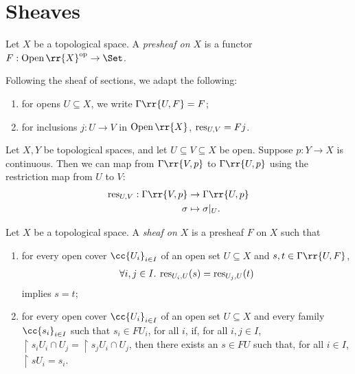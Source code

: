 \documentclass{article}
\begin{document}
\section{Sheaves}\label{sec:sheaves}

\begin{definition}
  Let $X$ be a topological space. A \emph{presheaf on $X$} is a functor
  $F:\Open\rr{X}^{\text{op}}\to\Set$.
\end{definition}

\begin{notation}
  Following the sheaf of sections, we adapt the following:
  \begin{enumerate}
    \item for opens $U\subseteq X$, we write $\Gamma\rr{U,F}=F$;
    \item for inclusions $j:U\to V$ in $\Open\rr{X}$, $\operatorname{res}_{U,V}=Fj$.
  \end{enumerate}
\end{notation}

\begin{example}
  Let $X, Y$ be topological spaces, and let $U \subseteq V \subseteq X$ be open. Suppose $p : Y \to X$ is continuous. Then we can map from $\Gamma\rr{V,p}$ to $\Gamma\rr{U,p}$ using the restriction map from $U$ to $V$:
  \begin{align*}
    \res_{U,V} : \Gamma\rr{V,p} &\to \Gamma\rr{U,p}\\
    \sigma &\mapsto \sigma|_U.
  \end{align*}
\end{example}

\begin{definition}
  Let $X$ be a topological space. A \emph{sheaf on $X$} is a presheaf $F$ on $X$
  such that
  \begin{enumerate}
    \item for every open cover $\cc{U_i}_{i\in I}$ of an open set $U\subseteq X$ and
      $s,t\in\Gamma\rr{U,F}$,
      \begin{align*}
        \forall i,j\in I.\: \operatorname{res}_{U_i,U}(s) = \operatorname{res}_{U_j,U}(t)
      \end{align*}
      implies $s=t$;
    \item for every open cover $\cc{U_i}_{i\in I}$ of an open set $U\subseteq X$
      and every family $\cc{s_i}_{i\in I}$ such that $s_i\in FU_i$, for all $i$,
      if, for all $i,j\in I$, $\restriction{s_i}{U_i\cap U_j} = \restriction{s_j}{U_i\cap U_j}$,
      then there exists an $s\in FU$ such that, for all $i\in I$,
      $\restriction{s}{U_i}=s_i$.
  \end{enumerate}
\end{definition}
\end{document}
